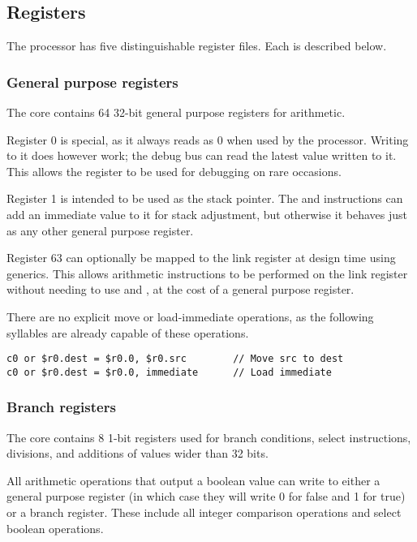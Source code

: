\subsection{Registers}
\label{sec:core-ug-isa-regs}

The \rvex{} processor has five distinguishable register files. Each is described
below.

\subsubsection{General purpose registers}
\label{sec:core-ug-isa-regs-gp}

The \rvex{} core contains 64 32-bit general purpose registers for arithmetic.

Register 0 is special, as it always reads as 0 when used by the processor.
Writing to it does however work; the debug bus can read the latest value written
to it. This allows the register to be used for debugging on rare occasions.

Register 1 is intended to be used as the stack pointer. The  and
 instructions can add an immediate value to it for stack adjustment,
but otherwise it behaves just as any other general purpose register.

Register 63 can optionally be mapped to the link register at design time using
generics. This allows arithmetic instructions to be performed on the link
register without needing to use  and , at the cost of a
general purpose register.

There are no explicit move or load-immediate operations, as the following
syllables are already capable of these operations.

\begin{lstlisting}[numbers=none, language=vexasm]
c0 or $r0.dest = $r0.0, $r0.src        // Move src to dest
c0 or $r0.dest = $r0.0, immediate      // Load immediate
\end{lstlisting}

\subsubsection{Branch registers}
\label{sec:core-ug-isa-regs-br}

The \rvex{} core contains 8 1-bit registers used for branch conditions, select
instructions, divisions, and additions of values wider than 32 bits.

All arithmetic operations that output a boolean value can write to either a
general purpose register (in which case they will write 0 for false and 1 for
true) or a branch register. These include all integer comparison operations and
select boolean operations.

